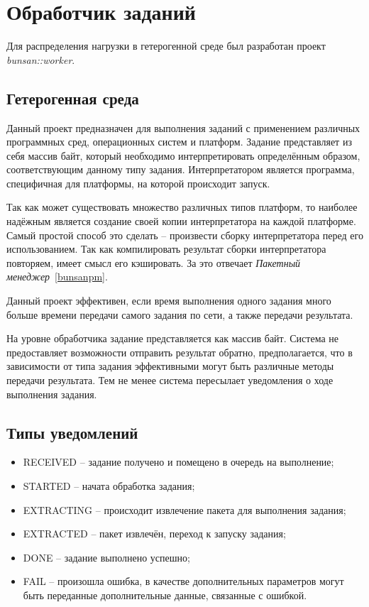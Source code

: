 \section{Обработчик заданий}
\label{bunsanworker}
Для распределения нагрузки в гетерогенной среде
был разработан проект \textit{bunsan::worker}.

\subsection{Гетерогенная среда}
Данный проект предназначен для выполнения заданий
с применением различных программных сред, операционных систем и платформ.
Задание представляет из себя массив байт, который необходимо
интерпретировать определённым образом,
соответствующим данному типу задания. Интерпретатором является
программа, специфичная для платформы, на которой
происходит запуск.

Так как может существовать множество различных
типов платформ, то наиболее надёжным является создание своей копии
интерпретатора на каждой платформе.
Самый простой способ это сделать -- произвести сборку
интерпретатора перед его использованием.
Так как компилировать результат сборки интерпретатора повторяем,
имеет смысл его кэшировать.
За это отвечает \textit{Пакетный менеджер}~\ref{bunsanpm}.

Данный проект эффективен,
если время выполнения одного задания много больше
времени передачи самого задания по сети,
а также передачи результата.

На уровне обработчика задание
представляется как массив байт. Система
не предоставляет возможности отправить результат
обратно, предполагается, что в зависимости
от типа задания эффективными могут быть различные методы передачи результата.
Тем не менее система пересылает уведомления о ходе выполнения задания.

\subsection{Типы уведомлений}
\begin{itemize}
    \item RECEIVED -- задание получено и помещено в очередь на выполнение;
    \item STARTED -- начата обработка задания;
    \item EXTRACTING -- происходит извлечение пакета для выполнения задания;
    \item EXTRACTED -- пакет извлечён, переход к запуску задания;
    \item DONE -- задание выполнено успешно;
    \item FAIL -- произошла ошибка,
        в качестве дополнительных параметров могут быть переданные дополнительные данные,
        связанные с ошибкой.
\end{itemize}

